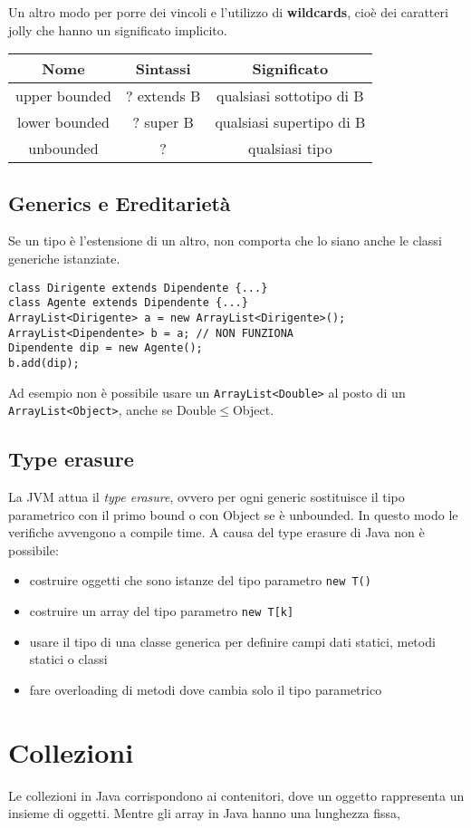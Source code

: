 Un altro modo per porre dei vincoli e l'utilizzo di \textbf{wildcards}, cioè dei caratteri jolly che hanno un significato implicito.

\begin{table}[H]
\centering
\begin{tabular}{|c|c|c|}
\hline
\textbf{Nome} & \textbf{Sintassi} & \textbf{Significato} \\
\hline
upper bounded & ? extends B & qualsiasi sottotipo di B \\
\hline
lower bounded & ? super B & qualsiasi supertipo di B \\
\hline
unbounded & ? & qualsiasi tipo \\
\hline
\end{tabular}
\end{table}

\subsection{Generics e Ereditarietà}
Se un tipo è l'estensione di un altro, non comporta che lo siano anche le classi generiche istanziate. 
\begin{lstlisting}
class Dirigente extends Dipendente {...}
class Agente extends Dipendente {...}
ArrayList<Dirigente> a = new ArrayList<Dirigente>();
ArrayList<Dipendente> b = a; // NON FUNZIONA
Dipendente dip = new Agente();
b.add(dip); 
\end{lstlisting}
Ad esempio non è possibile usare un \texttt{ArrayList<Double>} al posto di un \texttt{ArrayList<Object>}, anche se Double$\le$Object.

\subsection{Type erasure}
La JVM attua il \textit{type erasure}, ovvero per ogni generic sostituisce il tipo parametrico con il primo bound o con Object se è unbounded. In questo modo le verifiche avvengono a compile time. A causa del type erasure di Java non è possibile:
\begin{itemize}
\item costruire oggetti che sono istanze del tipo parametro \texttt{new T()}
\item costruire un array del tipo parametro \texttt{new T[k]}
\item usare il tipo di una classe generica per definire campi dati statici, metodi statici o classi
\item fare overloading di metodi dove cambia solo il tipo parametrico
\end{itemize}

\section{Collezioni}
Le collezioni in Java corrispondono ai contenitori, dove un oggetto rappresenta un insieme di oggetti. Mentre gli array in Java hanno una lunghezza fissa, 
